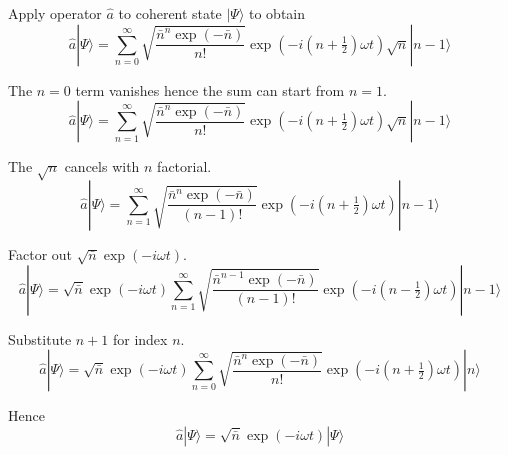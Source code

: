 \documentclass[12pt]{article}
\begin{document}
Apply operator $\hat a$ to coherent state $|\Psi\rangle$ to obtain
\begin{equation*}
\hat a|\Psi\rangle
=\sum_{n=0}^\infty
\sqrt{\frac{\bar n^n\exp(-\bar n)}{n!}}
\exp\left(-i\left(n+\tfrac{1}{2}\right)\omega t\right)
\sqrt n|n-1\rangle
\end{equation*}

The $n=0$ term vanishes hence the sum can start from $n=1$.
\begin{equation*}
\hat a|\Psi\rangle
=\sum_{n=1}^\infty
\sqrt{\frac{\bar n^n\exp(-\bar n)}{n!}}
\exp\left(-i\left(n+\tfrac{1}{2}\right)\omega t\right)
\sqrt n|n-1\rangle
\end{equation*}

The $\sqrt n$ cancels with $n$ factorial.
\begin{equation*}
\hat a|\Psi\rangle
=\sum_{n=1}^\infty
\sqrt{\frac{\bar n^n\exp(-\bar n)}{(n-1)!}}
\exp\left(-i\left(n+\tfrac{1}{2}\right)\omega t\right)
|n-1\rangle
\end{equation*}

Factor out $\sqrt{\bar n}\exp(-i\omega t)$.
\begin{equation*}
\hat a|\Psi\rangle
=\sqrt{\bar n}\exp(-i\omega t)
\sum_{n=1}^\infty
\sqrt{\frac{\bar n^{n-1}\exp(-\bar n)}{(n-1)!}}
\exp\left(-i\left(n-\tfrac{1}{2}\right)\omega t\right)
|n-1\rangle
\end{equation*}

Substitute $n+1$ for index $n$.
\begin{equation*}
\hat a|\Psi\rangle
=\sqrt{\bar n}\exp(-i\omega t)
\sum_{n=0}^\infty
\sqrt{\frac{\bar n^n\exp(-\bar n)}{n!}}
\exp\left(-i\left(n+\tfrac{1}{2}\right)\omega t\right)
|n\rangle
\end{equation*}

Hence
\begin{equation*}
\hat a|\Psi\rangle=\sqrt{\bar n}\exp(-i\omega t)|\Psi\rangle
\end{equation*}
\end{document}
